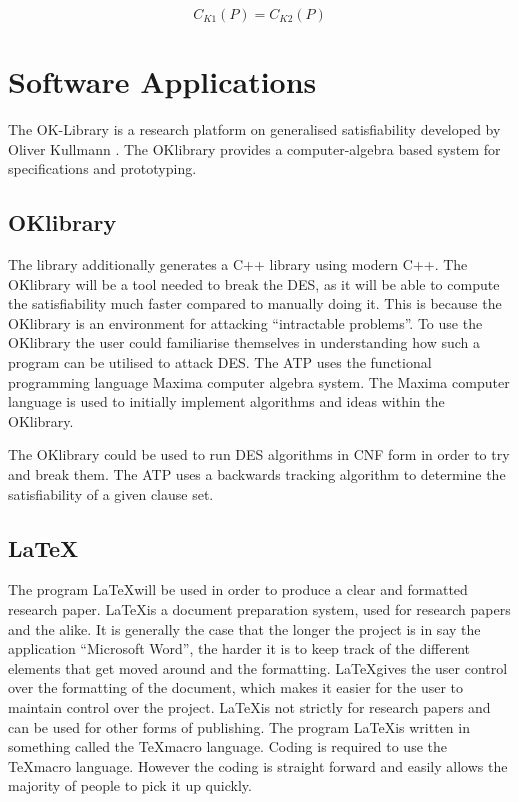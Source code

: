 \documentclass[11pt,a4paper, notitlepage]{report}
\begin{document}
\begin{displaymath}
C_{K1}(P) = C_{K2}(P)
\end{displaymath}
















\chapter{Software Applications}
\label{cha:softApp}

The OK-Library is a research platform on generalised satisfiability developed by Oliver Kullmann \cite{Oliver2013OKlibrary}. The OKlibrary provides a computer-algebra based system for specifications and prototyping.


\section{OKlibrary}
\label{sec:OKl}

The library additionally generates a C++ library using modern C++.
The OKlibrary will be a tool needed to break the DES, as it will be able to compute the satisfiability much faster compared to manually doing it. This is because the OKlibrary is an environment for attacking “intractable problems”. To use the OKlibrary the user could familiarise themselves in understanding how such a program can be utilised to attack DES.
The ATP uses the functional programming language Maxima computer algebra system. The Maxima computer language is used to initially implement algorithms and ideas within the OKlibrary.

The OKlibrary could be used to run DES algorithms in CNF form in order to try and break them. The ATP uses a backwards tracking algorithm to determine the satisfiability of a given clause set. 


\section{\LaTeX}
\label{sec:LaTeX}

The program \LaTeX will be used in order to produce a clear and formatted research paper. \LaTeX\space is a document preparation system, used for research papers and the alike. It is generally the case that the longer the project is in say the application “Microsoft Word”, the harder it is to keep track of the different elements that get moved around and the formatting. \LaTeX\space gives the user control over the formatting of the document, which makes it easier for the user to maintain control over the project. \LaTeX\space is not strictly for research papers and can be used for other forms of publishing. The program \LaTeX\space is written in something called the \TeX\space macro language. Coding is required to use the \TeX\space macro language. However the coding is straight forward and easily allows the majority of people to pick it up quickly.
\end{document}
